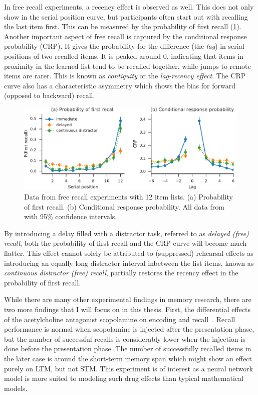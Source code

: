 In free recall experiments, a recency effect is observed as well.
This does not only show in the serial position curve, but participants often start out with recalling the last item first.
This can be measured by the probability of first recall (\cref{fig:exp-free-recall}).
Another important aspect of free recall is captured by the conditional response probability (CRP).
It gives the probability for the difference (the \emph{lag}) in serial positions of two recalled items.
It is peaked around 0, indicating that items in proximity in the learned list tend to be recalled together, while jumps to remote items are rarer.
This is known as \emph{contiguity} or the \emph{lag-recency effect}.
The CRP curve also has a characteristic asymmetry which shows the bias for forward (opposed to backward) recall.
\begin{figure}
    \centering
    \includegraphics{figures/exp-free-recall}
    \caption[Free recall probablitiy of first recall and CRP]{Data from free recall experiments with 12 item lists. (a) Probability of first recall. (b) Conditional response probability. All data from \textcite{Howard1999} with 95\% confidence intervals.}\label{fig:exp-free-recall}
\end{figure}

By introducing a delay filled with a distractor task, referred to as \emph{delayed (free) recall}, both the probability of first recall and the CRP curve will become much flatter.
This effect cannot solely be attributed to (suppressed) rehearsal effects as introducing an equally long distractor interval inbetween the list items, known as \emph{continuous distractor (free) recall}, partially restores the recency effect in the probability of first recall.

While there are many other experimental findings in memory research, there are two more findings that I will focus on in this thesis.
First, the differential effects of the acetylcholine antagonist scopolamine on encoding and recall~\parencite{ghoneim1975}.
Recall performance is normal when scopolamine is injected after the presentation phase, but the number of successful recalls is considerably lower when the injection is done before the presentation phase.
The number of successfully recalled items in the later case is around the short-term memory span which might show an effect purely on LTM, but not STM\@.
This experiment is of interest as a neural network model is more suited to modeling such drug effects than typical mathematical models.


